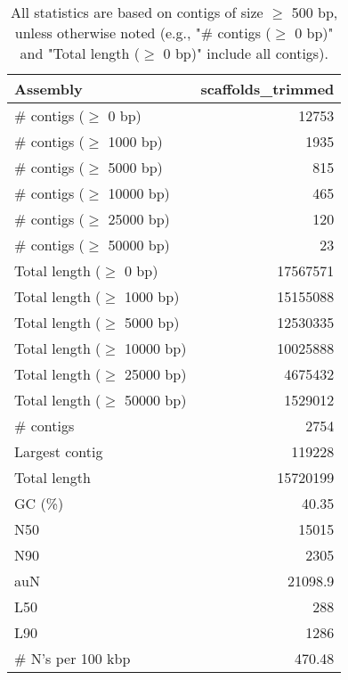\documentclass[12pt,a4paper]{article}
\begin{document}
\begin{table}[ht]
\begin{center}
\caption{All statistics are based on contigs of size $\geq$ 500 bp, unless otherwise noted (e.g., "\# contigs ($\geq$ 0 bp)" and "Total length ($\geq$ 0 bp)" include all contigs).}
\begin{tabular}{|l*{1}{|r}|}
\hline
Assembly & scaffolds\_trimmed \\ \hline
\# contigs ($\geq$ 0 bp) & 12753 \\ \hline
\# contigs ($\geq$ 1000 bp) & 1935 \\ \hline
\# contigs ($\geq$ 5000 bp) & 815 \\ \hline
\# contigs ($\geq$ 10000 bp) & 465 \\ \hline
\# contigs ($\geq$ 25000 bp) & 120 \\ \hline
\# contigs ($\geq$ 50000 bp) & 23 \\ \hline
Total length ($\geq$ 0 bp) & 17567571 \\ \hline
Total length ($\geq$ 1000 bp) & 15155088 \\ \hline
Total length ($\geq$ 5000 bp) & 12530335 \\ \hline
Total length ($\geq$ 10000 bp) & 10025888 \\ \hline
Total length ($\geq$ 25000 bp) & 4675432 \\ \hline
Total length ($\geq$ 50000 bp) & 1529012 \\ \hline
\# contigs & 2754 \\ \hline
Largest contig & 119228 \\ \hline
Total length & 15720199 \\ \hline
GC (\%) & 40.35 \\ \hline
N50 & 15015 \\ \hline
N90 & 2305 \\ \hline
auN & 21098.9 \\ \hline
L50 & 288 \\ \hline
L90 & 1286 \\ \hline
\# N's per 100 kbp & 470.48 \\ \hline
\end{tabular}
\end{center}
\end{table}
\end{document}
